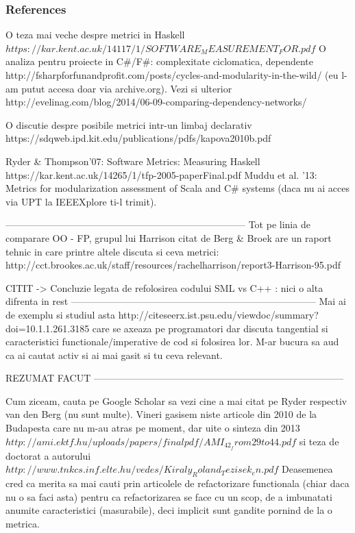 \documentclass{article}
\begin{document}
\subsubsection {References}

O teza mai veche despre metrici in Haskell
        $https://kar.kent.ac.uk/14117/1/SOFTWARE_MEASUREMENT_FOR.pdf$
O analiza pentru proiecte in C\#/F\#: complexitate ciclomatica, dependente
        http://fsharpforfunandprofit.com/posts/cycles-and-modularity-in-the-wild/
(eu l-am putut accesa doar via archive.org). Vezi si ulterior
        http://evelinag.com/blog/2014/06-09-comparing-dependency-networks/

O discutie despre posibile metrici intr-un limbaj declarativ
        https://sdqweb.ipd.kit.edu/publications/pdfs/kapova2010b.pdf

Ryder \& Thompson'07: Software Metrics: Measuring Haskell https://kar.kent.ac.uk/14265/1/tfp-2005-paperFinal.pdf
Muddu et al. '13: Metrics for modularization assessment of Scala and C\# systems
(daca nu ai acces via UPT la IEEEXplore ti-l trimit).


---------------------------------------------------------------------------
Tot pe linia de comparare OO - FP, grupul lui Harrison citat de
Berg \& Broek are un raport tehnic in care printre altele discuta
si ceva metrici:
        http://cct.brookes.ac.uk/staff/resources/rachelharrison/report3-Harrison-95.pdf



CITIT -> Concluzie legata de refolosirea codului SML vs C++ : nici o alta difrenta in rest        
-----------------------------------------------------------------------------
Mai ai de exemplu si studiul asta
        http://citeseerx.ist.psu.edu/viewdoc/summary?doi=10.1.1.261.3185
care se axeaza pe programatori dar discuta tangential si caracteristici
functionale/imperative de cod si folosirea lor.
M-ar bucura sa aud ca ai cautat activ si ai mai gasit si tu ceva relevant.


REZUMAT FACUT
------------------------------------------------------------------------------

Cum ziceam, cauta pe Google Scholar sa vezi cine a mai citat pe
Ryder respectiv van den Berg (nu sunt multe). Vineri gasisem niste
articole din 2010 de la Budapesta care nu m-au atras pe moment,
dar uite o sinteza din 2013
        $http://ami.ektf.hu/uploads/papers/finalpdf/AMI_42_from29to44.pdf$
si teza de doctorat a autorului
$        http://www.tnkcs.inf.elte.hu/vedes/Kiraly_Roland_Tezisek_en.pdf$
Deasemenea cred ca merita sa mai cauti prin articolele de refactorizare
functionala (chiar daca nu o sa faci asta) pentru ca refactorizarea
se face cu un scop, de a imbunatati anumite caracteristici (masurabile),
deci implicit sunt gandite pornind de la o metrica.
\end{document}
